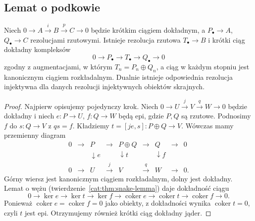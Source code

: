 \subsection{Lemat o podkowie}
\begin{twierdzenie}\label{cat:thm:horseshoe}
Niech $0\to A\xrightarrow{i}B\xrightarrow{p}C\to0$ będzie krótkim ciągiem dokładnym, a $P_\bullet\to A$, $Q_\bullet\to C$ rezolucjami rzutowymi. Istnieje rezolucja rzutowa $T_\bullet\to B$ i krótki ciąg dokładny kompleksów
\[
 0\to P_\bullet\to T_\bullet\to Q_\bullet\to0
\]
zgodny z augmentacjami, w którym $T_n=P_n\oplus Q_n$, a ciąg w każdym stopniu jest kanonicznym ciągiem rozkładalnym. Dualnie istnieje odpowiednia rezolucja injektywna dla danych rezolucji injektywnych obiektów skrajnych.
\end{twierdzenie}
\begin{proof}
Najpierw opisujemy pojedynczy krok. Niech $0\to U\xrightarrow{j}V\xrightarrow{q}W\to0$ będzie dokładny i niech $e:P\to U$, $f:Q\to W$ będą epi, gdzie $P,Q$ są rzutowe. Podnosimy $f$ do $s:Q\to V$ z $qs=f$. Kładziemy $t=[je,s]:P\oplus Q\to V$. Wówczas mamy przemienny diagram
\[
\begin{array}{ccccccccc}
0&\to&P&\to&P\oplus Q&\to&Q&\to&0\\
&&\downarrow e&&\downarrow t&&\downarrow f\\
0&\to&U&\xrightarrow{j}&V&\xrightarrow{q}&W&\to&0 .
\end{array}
\]
Górny wiersz jest kanonicznym ciągiem rozkładalnym, dolny jest dokładny. Lemat o wężu (twierdzenie~\ref{cat:thm:snake-lemma}) daje dokładność ciągu
\[
 0\to\ker e\to\ker t\to\ker f
 \to\operatorname{coker}e\to\operatorname{coker}t
 \to\operatorname{coker}f\to0.
\]
Ponieważ $\operatorname{coker}e=\operatorname{coker}f=0$ jako obiekty, z dokładności wynika $\operatorname{coker}t=0$, czyli $t$ jest epi. Otrzymujemy również krótki ciąg dokładny jąder.


\end{proof}
